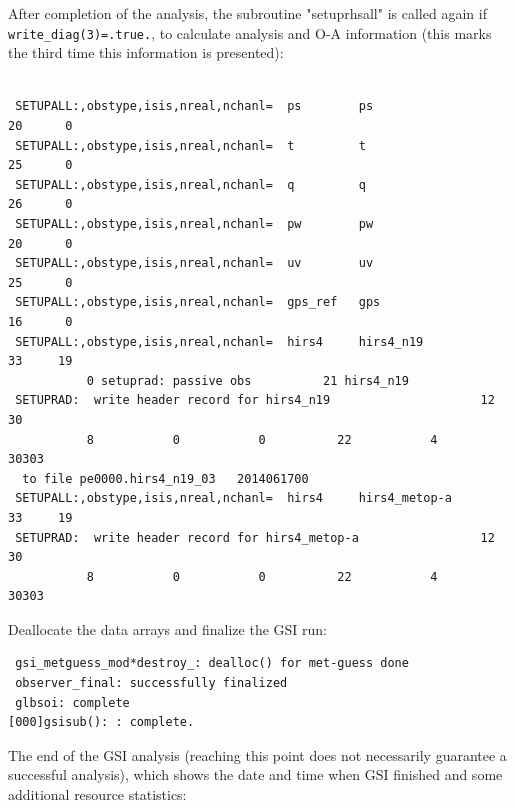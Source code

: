 After completion of the analysis, the subroutine "setuprhsall" is called again if \verb|write_diag(3)=.true.|, to calculate analysis and O-A information (this marks the third time this information is presented):
\begin{scriptsize}
\begin{verbatim}

 SETUPALL:,obstype,isis,nreal,nchanl=  ps        ps                       20      0
 SETUPALL:,obstype,isis,nreal,nchanl=  t         t                        25      0
 SETUPALL:,obstype,isis,nreal,nchanl=  q         q                        26      0
 SETUPALL:,obstype,isis,nreal,nchanl=  pw        pw                       20      0
 SETUPALL:,obstype,isis,nreal,nchanl=  uv        uv                       25      0
 SETUPALL:,obstype,isis,nreal,nchanl=  gps_ref   gps                      16      0
 SETUPALL:,obstype,isis,nreal,nchanl=  hirs4     hirs4_n19                33     19
           0 setuprad: passive obs          21 hirs4_n19
 SETUPRAD:  write header record for hirs4_n19                     12          30
           8           0           0          22           4       30303
  to file pe0000.hirs4_n19_03   2014061700
 SETUPALL:,obstype,isis,nreal,nchanl=  hirs4     hirs4_metop-a            33     19
 SETUPRAD:  write header record for hirs4_metop-a                 12          30
           8           0           0          22           4       30303

\end{verbatim}
\end{scriptsize}
Deallocate the data arrays and finalize the GSI run:
\begin{scriptsize}
\begin{verbatim}
 gsi_metguess_mod*destroy_: dealloc() for met-guess done
 observer_final: successfully finalized
 glbsoi: complete
[000]gsisub(): : complete.
\end{verbatim}
\end{scriptsize}
The end of the GSI analysis (reaching this point does not necessarily guarantee a successful analysis), which shows the date and time when GSI finished and some additional resource statistics:
